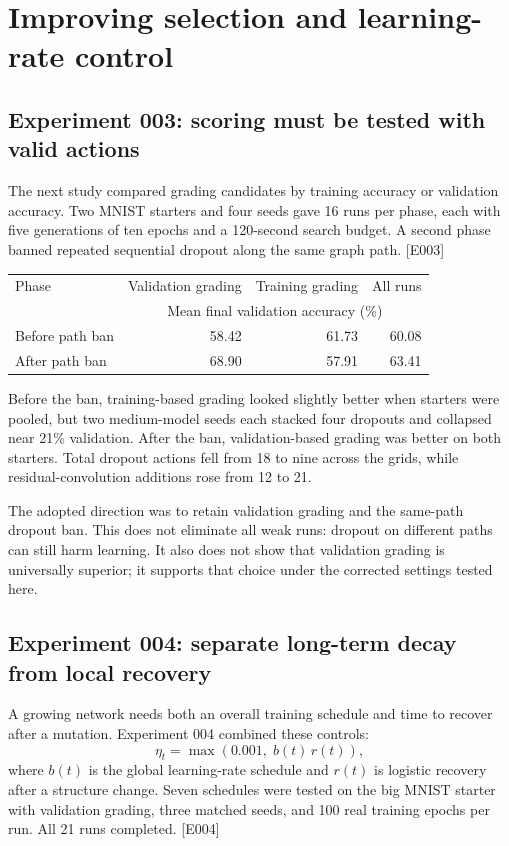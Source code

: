 \documentclass[11pt,a4paper]{article}
\newcommand{\ev}[1]{\textcolor{ink}{\small[#1]}}
\begin{document}
\newpage
\section{Improving selection and learning-rate control}
\subsection{Experiment 003: scoring must be tested with valid actions}
The next study compared grading candidates by training accuracy or validation accuracy. Two MNIST starters and four seeds gave 16 runs per phase, each with five generations of ten epochs and a 120-second search budget. A second phase banned repeated sequential dropout along the same graph path. \ev{E003}

\begin{center}
\begin{tabular}{lrrr}\toprule
Phase & Validation grading & Training grading & All runs\\
 &\multicolumn{3}{c}{Mean final validation accuracy (\%)}\\\midrule
Before path ban &58.42&61.73&60.08\\
After path ban &68.90&57.91&63.41\\\bottomrule
\end{tabular}
\end{center}

Before the ban, training-based grading looked slightly better when starters were pooled, but two medium-model seeds each stacked four dropouts and collapsed near 21\% validation. After the ban, validation-based grading was better on both starters. Total dropout actions fell from 18 to nine across the grids, while residual-convolution additions rose from 12 to 21.

The adopted direction was to retain validation grading and the same-path dropout ban. This does not eliminate all weak runs: dropout on different paths can still harm learning. It also does not show that validation grading is universally superior; it supports that choice under the corrected settings tested here.

\subsection{Experiment 004: separate long-term decay from local recovery}
A growing network needs both an overall training schedule and time to recover after a mutation. Experiment 004 combined these controls:
\[
\eta_t=\max\!\left(0.001,\;b(t)\,r(t)\right),
\]
where $b(t)$ is the global learning-rate schedule and $r(t)$ is logistic recovery after a structure change. Seven schedules were tested on the big MNIST starter with validation grading, three matched seeds, and 100 real training epochs per run. All 21 runs completed. \ev{E004}
\end{document}
